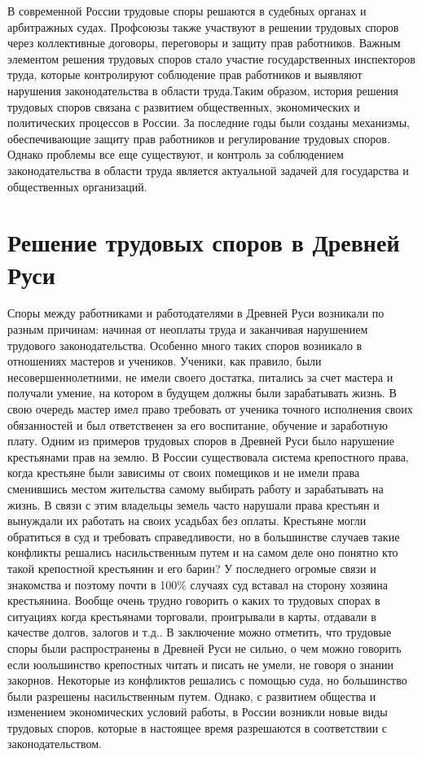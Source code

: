 В современной России трудовые споры решаются в судебных органах и арбитражных судах. Профсоюзы также участвуют в решении трудовых споров через коллективные договоры, переговоры и защиту прав работников. Важным элементом решения трудовых споров стало участие государственных инспекторов труда, которые контролируют соблюдение прав работников и выявляют нарушения законодательства в области труда.Таким образом, история решения трудовых споров связана с развитием общественных, экономических и политических процессов в России. За последние годы были созданы механизмы, обеспечивающие защиту прав работников и регулирование трудовых споров. Однако проблемы все еще существуют, и контроль за соблюдением законодательства в области труда является актуальной задачей для государства и общественных организаций.

\section{Решение трудовых споров в Древней Руси}
Споры между работниками и работодателями в Древней Руси возникали по разным причинам: начиная от неоплаты труда и заканчивая нарушением трудового законодательства. Особенно много таких споров возникало в отношениях мастеров и учеников. Ученики, как правило, были несовершеннолетними, не имели своего достатка, питались за счет мастера и получали умение, на котором в будущем должны были зарабатывать жизнь. В свою очередь мастер имел право требовать от ученика точного исполнения своих обязанностей и был ответственен за его воспитание, обучение и заработную плату. Одним из примеров трудовых споров в Древней Руси было нарушение крестьянами прав на землю. В России существовала система крепостного права, когда крестьяне были зависимы от своих помещиков и не имели права сменившись местом жительства самому выбирать работу и зарабатывать на жизнь. В связи с этим владельцы земель часто нарушали права крестьян и вынуждали их работать на своих усадьбах без оплаты. Крестьяне могли обратиться в суд и требовать справедливости, но в большинстве случаев такие конфликты решались насильственным путем и на самом деле оно понятно кто такой крепостной крестьянин и его барин? У последнего огромые связи и знакомства и поэтому почти в 100\% случаях суд вставал на сторону хозяина крестьянина. Вообще очень трудно говорить о каких то трудовых спорах в ситуациях когда крестьянами торговали, проигрывали в карты, отдавали в качестве долгов, залогов и т.д.. В заключение можно отметить, что трудовые споры были распространены в Древней Руси не сильно, о чем можно говорить если юольшинство крепостных читать и писать не умели, не говоря о знании закорнов. Некоторые из конфликтов решались с помощью суда, но большинство были разрешены насильственным путем. Однако, с развитием общества и изменением экономических условий работы, в России возникли новые виды трудовых споров, которые в настоящее время разрешаются в соответствии с законодательством.

